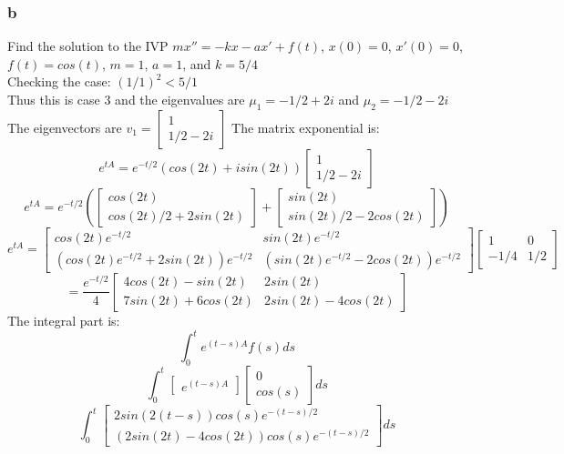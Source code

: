 \documentclass{article}
\begin{document}
\subsubsection*{b}
Find the solution to the IVP $mx'' = -kx - ax' + f(t)$, $x(0) = 0$, $x'(0) = 0$, $f(t) = cos(t)$, $m=1$, $a=1$, and $k = 5/4$\\
Checking the case: $(1/1)^2 < 5/1$\\
Thus this is case 3 and the eigenvalues are $\mu_1 = -1/2 + 2i$ and $\mu_2 = -1/2 - 2i$\\
The eigenvectors are $v_1 = \begin{bmatrix}
    1\\
    1/2 - 2i
\end{bmatrix}$ 
The matrix exponential is:
$$ e^{tA} = e^{-t/2} 
    (cos(2t) + isin(2t)) \begin{bmatrix}
    1 \\
    1/2 - 2i
\end{bmatrix}$$
$$ e^{tA} = e^{-t/2} (\begin{bmatrix}
    cos(2t) \\
    cos(2t)/2 + 2sin(2t)
\end{bmatrix} + \begin{bmatrix}
    sin(2t) \\
    sin(2t)/2 - 2cos(2t)
\end{bmatrix})$$
$$e^{tA} =  \begin{bmatrix}
    cos(2t)e^{-t/2} & sin(2t)e^{-t/2}\\
    (cos(2t)e^{-t/2} + 2sin(2t))e^{-t/2} & (sin(2t)e^{-t/2} - 2cos(2t))e^{-t/2}
\end{bmatrix} \begin{bmatrix}
    1 & 0\\
    -1/4 & 1/2
\end{bmatrix}$$
$$= \frac{e^{-t/2}}{4}\begin{bmatrix}
    4cos(2t) - sin(2t) & 2sin(2t) \\
    7sin(2t) + 6cos(2t) &  2sin(2t) - 4cos(2t)
\end{bmatrix} $$
The integral part is:
$$ \int_0^t e^{(t-s)A}f(s)ds$$
$$ \int_0^t \begin{bmatrix}
    e^{(t-s)A}
\end{bmatrix} \begin{bmatrix}
    0\\
    cos(s)
\end{bmatrix} ds$$
$$ \int_{0}^{t} \begin{bmatrix}
    2sin(2(t-s))cos(s)e^{-(t-s)/2} \\
    (2sin(2t) - 4cos(2t))cos(s)e^{-(t-s)/2}
\end{bmatrix}ds$$
\end{document}
